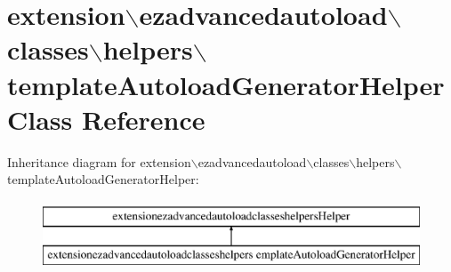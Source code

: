 \hypertarget{classextension_1_1ezadvancedautoload_1_1classes_1_1helpers_1_1template_autoload_generator_helper}{\section{extension$\backslash$ezadvancedautoload$\backslash$classes$\backslash$helpers$\backslash$template\-Autoload\-Generator\-Helper Class Reference}
\label{classextension_1_1ezadvancedautoload_1_1classes_1_1helpers_1_1template_autoload_generator_helper}
}
Inheritance diagram for extension$\backslash$ezadvancedautoload$\backslash$classes$\backslash$helpers$\backslash$template\-Autoload\-Generator\-Helper\-:\begin{figure}[H]
\begin{center}
\leavevmode
\includegraphics[height=2.000000cm]{classextension_1_1ezadvancedautoload_1_1classes_1_1helpers_1_1template_autoload_generator_helper}
\end{center}
\end{figure}
